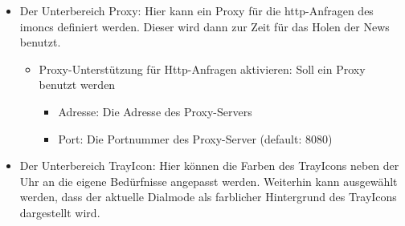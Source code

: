 \begin{itemize}
  \item Der Unterbereich Proxy:
    Hier kann ein Proxy für die http-Anfragen des imoncs definiert werden. 
    Dieser wird dann zur Zeit für das Holen der News benutzt.
    \begin{itemize}
    \item Proxy-Unterstützung für Http-Anfragen aktivieren: Soll ein Proxy 
      benutzt werden
          \begin{itemize}
            \item Adresse: Die Adresse des Proxy-Servers
            \item Port: Die Portnummer des Proxy-Server (default: 8080)
          \end{itemize}
    \end{itemize}
    
  \item Der Unterbereich TrayIcon:
  	Hier können die Farben des TrayIcons neben der Uhr an die eigene Bedürfnisse
  	angepasst werden. Weiterhin kann ausgewählt werden, dass der aktuelle
  	Dialmode als farblicher Hintergrund des TrayIcons dargestellt wird.


\end{itemize}
